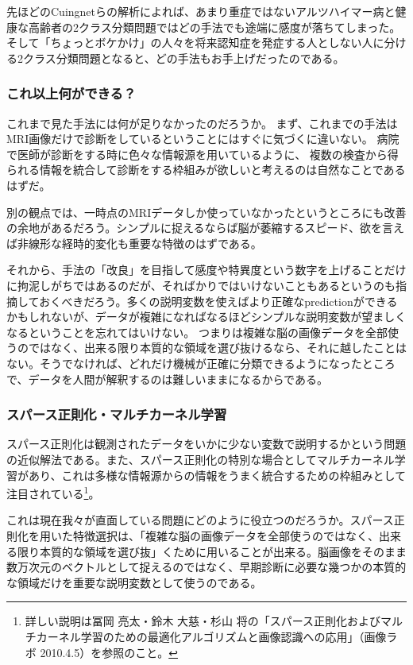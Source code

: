 先ほどのCuingnetらの解析によれば、あまり重症ではないアルツハイマー病と健康な高齢者の2クラス分類問題ではどの手法でも途端に感度が落ちてしまった。そして「ちょっとボケかけ」の人々を将来認知症を発症する人としない人に分ける2クラス分類問題となると、どの手法もお手上げだったのである。

\subsubsection{これ以上何ができる？}
これまで見た手法には何が足りなかったのだろうか。
まず、これまでの手法はMRI画像だけで診断をしているということにはすぐに気づくに違いない。
病院で医師が診断をする時に色々な情報源を用いているように、
複数の検査から得られる情報を統合して診断をする枠組みが欲しいと考えるのは自然なことであるはずだ。

別の観点では、一時点のMRIデータしか使っていなかったというところにも改善の余地があるだろう。シンプルに捉えるならば脳が萎縮するスピード、欲を言えば非線形な経時的変化も重要な特徴のはずである。

それから、手法の「改良」を目指して感度や特異度という数字を上げることだけに拘泥しがちではあるのだが、そればかりではいけないこともあるというのも指摘しておくべきだろう。多くの説明変数を使えばより正確なpredictionができるかもしれないが、データが複雑になればなるほどシンプルな説明変数が望ましくなるということを忘れてはいけない。
つまりは複雑な脳の画像データを全部使うのではなく、出来る限り本質的な領域を選び抜けるなら、それに越したことはない。そうでなければ、どれだけ機械が正確に分類できるようになったところで、データを人間が解釈するのは難しいままになるからである。

\subsubsection{スパース正則化・マルチカーネル学習}
スパース正則化は観測されたデータをいかに少ない変数で説明するかという問題の近似解法である。また、スパース正則化の特別な場合としてマルチカーネル学習があり、これは多様な情報源からの情報をうまく統合するための枠組みとして注目されている\footnote{詳しい説明は冨岡 亮太・鈴木 大慈・杉山 将の「スパース正則化およびマルチカーネル学習のための最適化アルゴリズムと画像認識への応用」（画像ラボ 2010.4.5）を参照のこと。}。

これは現在我々が直面している問題にどのように役立つのだろうか。スパース正則化を用いた特徴選択は、「複雑な脳の画像データを全部使うのではなく、出来る限り本質的な領域を選び抜」くために用いることが出来る。脳画像をそのまま数万次元のベクトルとして捉えるのではなく、早期診断に必要な幾つかの本質的な領域だけを重要な説明変数として使うのである。


